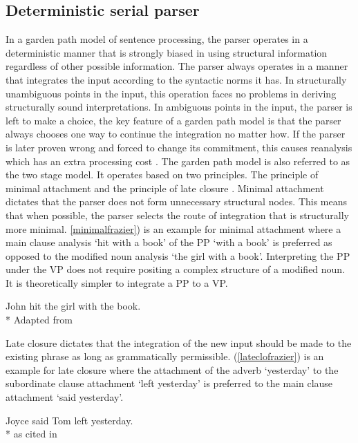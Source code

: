 \subsection{Deterministic serial parser}

In a garden path model of sentence processing, the parser operates in a deterministic manner that is strongly biased in using structural information regardless of other possible information. The parser always operates in a manner that integrates the input according to the syntactic norms it has. In structurally unambiguous points in the input, this operation faces no problems in deriving structurally sound interpretations. In ambiguous points in the input, the parser is left to make a choice, the key feature of a garden path model is that the parser always chooses one way to continue the integration no matter how. If the parser is later proven wrong and forced to change its commitment, this causes reanalysis which has an extra processing cost \citep{frazier1978sausage}. The garden path model is also referred to as the two stage model. It operates based on two principles. The principle of minimal attachment and the principle of late closure \citep{frazier1987sentence}. Minimal attachment dictates that the parser does not form unnecessary structural nodes. This means that when possible, the parser selects the route of integration that is structurally more minimal. \ref{minimalfrazier}) is an example for minimal attachment where a main clause analysis `hit with a book' of the PP `with a book' is preferred as opposed to the modified noun analysis `the girl with a book'. Interpreting the PP under the VP does not require positing a complex structure of a modified noun. It is theoretically simpler to integrate a PP to a VP.

\begin{exe}
\ex \label{minimalfrazier}
John hit the girl with the book. \\*
\hfill Adapted from \cite{frazier1987sentence}
\end{exe}


Late closure dictates that the integration of the new input should be made to the existing phrase as long as grammatically permissible. (\ref{lateclofrazier}) is an example for late closure where the attachment of the adverb `yesterday' to the subordinate clause attachment `left yesterday' is preferred to the main clause attachment `said yesterday'. 

\begin{exe}
\ex \label{lateclofrazier}
Joyce said Tom left yesterday. \\*
\hfill as cited in \cite{frazier1987sentence}
\end{exe}

